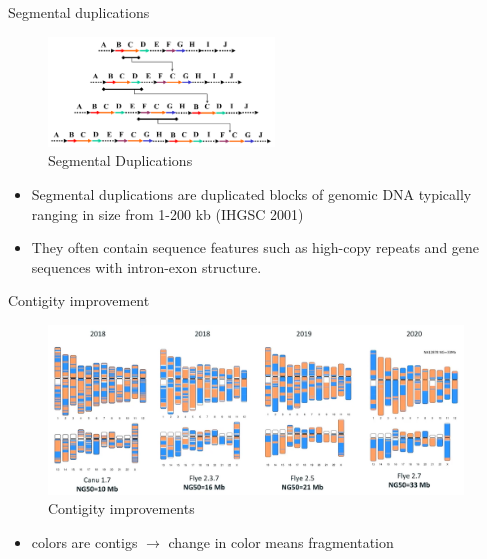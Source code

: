 \documentclass{beamer}
\begin{document}
  \begin{frame}{Segmental duplications}
    \begin{figure}
      \includegraphics[width=6cm]{presentation/images/SDs.png}
      \caption{Segmental Duplications}
      \label{fig:SD}
    \end{figure}
    \begin{itemize}
      \item Segmental duplications are duplicated blocks of genomic DNA typically ranging in size from 1-200 kb (IHGSC 2001)

      \item They often contain sequence features such as high-copy repeats and gene sequences with intron-exon structure. 
    \end{itemize}
  \end{frame}

  \begin{frame}{Contigity improvement}
    \begin{figure}
      \includegraphics[width=11cm]{presentation/images/contigity_improvement.png}
      \caption{Contigity improvements}
      \label{fig:contig_improvements}
    \end{figure}
    \begin{itemize}
      \item colors are contigs $\rightarrow$ change in color means fragmentation
    \end{itemize}
  \end{frame}
\end{document}
